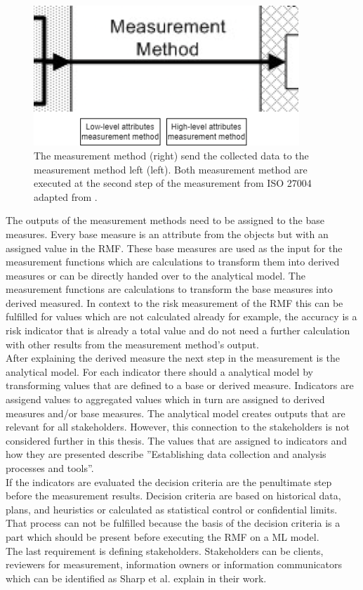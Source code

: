 \begin{figure}[ht!]
  \centering
  \includegraphics[width=10cm]{pictures/measurement_methods.png}
  \caption{The measurement method (right) send the collected data to the measurement method left (left). Both measurement method are executed at the second step of the measurement from ISO 27004  adapted from \cite{ISO_27004_2009}.}
  \label{fig:measurement_methods}
\end{figure}

The outputs of the measurement methods need to be assigned to the base measures. Every base measure is an attribute from the objects but with
an assigned value in the RMF. These base measures are used as the input for the measurement functions which are calculations to transform them into derived measures or can be directly handed over to the analytical model. The measurement functions are calculations to transform the base measures into derived measured. In context to the risk measurement of the RMF this can be fulfilled for values which are not calculated already for example, the accuracy is a risk indicator that is already a total value \cite{9783960101925} and do not need a further calculation with other results from the measurement method's output. \\
After explaining the derived measure the next step in the measurement is the analytical model. For each indicator there should a analytical model by transforming values that are defined to a base or derived measure. Indicators are assigend values to aggregated values which in turn are assigned to derived measures and/or base measures. The analytical model creates outputs that are relevant for all stakeholders. However, this connection to the stakeholders is not considered further in this thesis. The values that are assigned to indicators and how they are presented describe ''Establishing data collection and analysis processes and tools''. \\
If the indicators are evaluated the decision criteria are the penultimate step before the measurement results. Decision criteria are based on historical data, plans, and heuristics or calculated as statistical control or confidential limits. That process can not be fulfilled because the basis of the decision criteria is a part which should be present before executing the RMF on a ML model. \\
The last requirement is defining stakeholders. Stakeholders can be clients, reviewers for measurement, information owners or information communicators \cite{ISO_27004_2009} which can be identified as Sharp et al. \cite{DBLP:conf/dexaw/SharpFG99} explain in their work.

